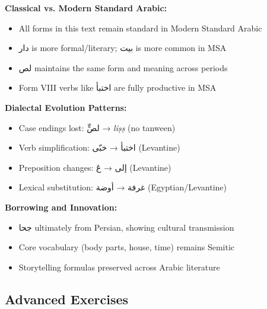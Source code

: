 \documentclass[letter,12pt]{article}
\begin{document}
\begin{tcolorbox}[colback=white,colframe=accentcolor,title=\textbf{Diachronic Analysis},breakable]
\textbf{Classical vs. Modern Standard Arabic:}
\begin{itemize}
\item All forms in this text remain standard in Modern Standard Arabic
\item \textarabic{دار} is more formal/literary; \textarabic{بيت} is more common in MSA
\item \textarabic{لص} maintains the same form and meaning across periods
\item Form VIII verbs like \textarabic{اختبأ} are fully productive in MSA
\end{itemize}

\textbf{Dialectal Evolution Patterns:}
\begin{itemize}
\item Case endings lost: \textarabic{لصٍّ} → \textit{liṣṣ} (no tanween)
\item Verb simplification: \textarabic{اختبأ} → \textarabic{خبّى} (Levantine)
\item Preposition changes: \textarabic{إلى} → \textarabic{عَ} (Levantine)
\item Lexical substitution: \textarabic{غرفة} → \textarabic{أوضة} (Egyptian/Levantine)
\end{itemize}

\textbf{Borrowing and Innovation:}
\begin{itemize}
\item \textarabic{جحا} ultimately from Persian, showing cultural transmission
\item Core vocabulary (body parts, house, time) remains Semitic
\item Storytelling formulas preserved across Arabic literature
\end{itemize}
\end{tcolorbox}

\subsection{Advanced Exercises}
\end{document}
